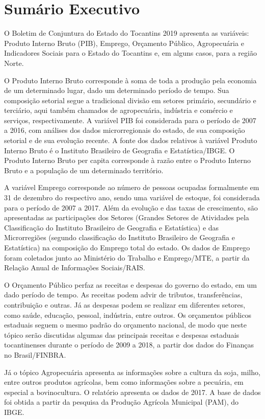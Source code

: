 \chapter*{Sumário Executivo}
\begin{center}
	\parbox{0.7\linewidth}{
		\par O Boletim de Conjuntura do Estado do Tocantins 2019 apresenta as variáveis: Produto Interno Bruto (PIB), Emprego, Orçamento Público, Agropecuária e Indicadores Sociais para o Estado do Tocantins e, em alguns casos, para a região Norte. 
		\par O Produto Interno Bruto corresponde à soma de toda a produção pela economia de um determinado lugar, dado um determinado período de tempo. Sua composição setorial segue a tradicional divisão em setores primário, secundário e terciário, aqui também chamados de agropecuária, indústria e comércio e serviços, respectivamente. A variável PIB foi considerada para o período de 2007 a 2016, com análises dos dados microrregionais do estado, de sua composição setorial e de sua evolução recente. A fonte dos dados relativos à variável Produto Interno Bruto é o Instituto Brasileiro de Geografia e Estatística/IBGE. O Produto Interno Bruto per capita corresponde à razão entre o Produto Interno Bruto e a população de um determinado território.  
		\par A variável Emprego corresponde ao número de pessoas ocupadas formalmente em 31 de dezembro do respectivo ano, sendo uma variável de estoque, foi considerada para o período de 2007 a 2017. Além da evolução e das taxas de crescimento, são apresentadas as participações dos Setores (Grandes Setores de Atividades pela Classificação do Instituto Brasileiro de Geografia e Estatística) e das Microrregiões (segundo classificação do Instituto Brasileiro de Geografia e Estatística) na composição do Emprego total do estado. Os dados de Emprego foram coletados junto ao Ministério do Trabalho e Emprego/MTE, a partir da Relação Anual de Informações Sociais/RAIS. 
		\par O Orçamento Público perfaz as receitas e despesas do governo do estado, em um dado período de tempo. As receitas podem advir de tributos, transferências, contribuição e outras. Já as despesas podem se realizar em diferentes setores, como saúde, educação, pessoal, indústria, entre outros. Os orçamentos públicos estaduais seguem o mesmo padrão do orçamento nacional, de modo que neste tópico serão discutidas algumas das principais receitas e despesas estaduais tocantinenses durante o período de 2009 a 2018, a partir dos dados do Finanças no Brasil/FINBRA. 
		\par Já o tópico Agropecuária apresenta as informações sobre a cultura da soja, milho, entre outros produtos agrícolas, bem como informações sobre a pecuária, em especial a bovinocultura. O relatório apresenta os dados de 2017. A base de dados foi obtida a partir da pesquisa da Produção Agrícola Municipal (PAM), do IBGE.
	}
\end{center}
\thispagestyle{empty}
